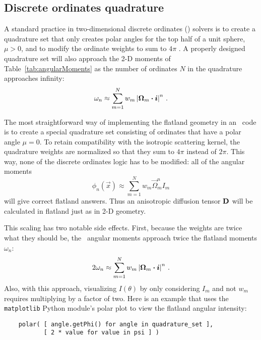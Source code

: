 \subsection{Discrete ordinates quadrature}

A standard practice in two-dimensional discrete ordinates (\SN) solvers is to
create a quadrature set that only creates polar angles for the top half of a
unit sphere, $\mu>0$, and to modify the ordinate weights to sum to $4\pi$
\cite{Zik1997}. A properly designed quadrature set will also approach the 2-D
moments of Table~\ref{tab:angularMoments} as the number of ordinates
$N$ in the quadrature approaches infinity:
\begin{equation*}
  \omega_n \approx \sum_{m=1}^{N} w_m \left|  \bm{\Omega}_m \bm{\cdot} \bm{i} \right|^n \,.
\end{equation*}

The most straightforward way of implementing the flatland geometry in an \SN\
code is to create a special quadrature set consisting of ordinates that have a
polar angle $\mu=0$. To retain compatibility with the isotropic scattering
kernel, the quadrature weights are normalized so that they sum to $4\pi$
instead of $2\pi$. This way, none of the discrete ordinates logic has to be
modified: all of the angular moments
\begin{equation*}
  \phi_n(\vec{x}) \approx \sum_{m=1}^{N} w_m \vec{\Omega}_m^n I_m
\end{equation*}
will give correct flatland answers. Thus an anisotropic diffusion tensor $\mathbf{D}$
will be calculated in flatland just as in 2-D geometry.

This scaling has two notable side effects. First, because the weights are twice
what they should be, the \SN\ angular moments approach twice the flatland
moments $\omega_n$:
\begin{equation*}
  2 \omega_n \approx \sum_{m=1}^{N} w_m \left|  \bm{\Omega}_m \bm{\cdot} \bm{i} \right|^n \,.
\end{equation*}
Also, with this approach, visualizing $I(\theta)$ by only considering
$I_m$ and not $w_m$ requires multiplying by a factor of two. Here is an
example that uses the \verb|matplotlib| Python module's polar plot to view
the flatland angular intensity:
\begin{verbatim}
    polar( [ angle.getPhi() for angle in quadrature_set ],
           [ 2 * value for value in psi ] )
\end{verbatim}

